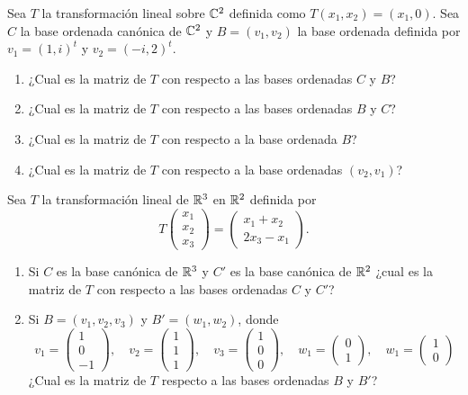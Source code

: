 \begin{exerciselist}
  \item Sea $T$ la transformación lineal sobre $\mathbb{C}^2$ definida como $T(x_1, x_2) = (x_1, 0)$. Sea $C$ la base ordenada canónica de $\mathbb{C}^2$ y $B = (v_1, v_2)$ la base ordenada definida por $v_1 = (1, i)^t$ y $v_2 = (-i, 2)^t$.
    \begin{enumerate}
      \item ¿Cual es la matriz de $T$ con respecto a las bases ordenadas $C$ y $B$?
      \item ¿Cual es la matriz de $T$ con respecto a las bases ordenadas $B$ y $C$?
      \item ¿Cual es la matriz de $T$ con respecto a la base ordenada $B$?
      \item ¿Cual es la matriz de $T$ con respecto a la base ordenadas $(v_2, v_1)$?
    \end{enumerate}

  \item Sea $T$ la transformación lineal de $\mathbb{R}^3$ en $\mathbb{R}^2$ definida por 
    \[ T\begin{pmatrix} x_1 \\ x_2 \\ x_3 \end{pmatrix} = \begin{pmatrix} x_1 + x_2 \\ 2x_3 - x_1 \end{pmatrix}. \]
    \begin{enumerate}
      \item Si $C$ es la base canónica de $\mathbb{R}^3$ y $C'$ es la base canónica de $\mathbb{R}^2$ ¿cual es la matriz de $T$ con respecto a las bases ordenadas $C$ y $C'$?
      \item Si $B = (v_1, v_2, v_3)$ y $B' = (w_1, w_2)$, donde
        \[
          v_1 = \begin{pmatrix} 1 \\ 0 \\ -1 \end{pmatrix}, \quad
          v_2 = \begin{pmatrix} 1 \\ 1 \\ 1 \end{pmatrix}, \quad
          v_3 = \begin{pmatrix} 1 \\ 0 \\ 0 \end{pmatrix}, \quad
          w_1 = \begin{pmatrix} 0 \\ 1 \end{pmatrix}, \quad
          w_1 = \begin{pmatrix} 1 \\ 0 \end{pmatrix}
        \]
        ¿Cual es la matriz de $T$ respecto a las bases ordenadas $B$ y $B'$?
    \end{enumerate}


\end{exerciselist}
